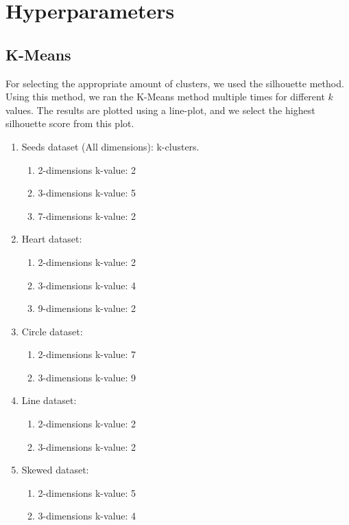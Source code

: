 \chapter{Hyperparameters}
\section{K-Means}
For selecting the appropriate amount of clusters, we used the silhouette method. 
Using this method, we ran the K-Means method multiple times for different $k$ values.
The results are plotted using a line-plot, and we select the highest silhouette score from this plot. 
\begin{enumerate}
  \item Seeds dataset (All dimensions): k-clusters.
  \begin{enumerate}
      \item 2-dimensions k-value: 2
      \item 3-dimensions k-value: 5
      \item 7-dimensions k-value: 2
  \end{enumerate}
      \item Heart dataset:
      \begin{enumerate}
          \item 2-dimensions k-value: 2
          \item 3-dimensions k-value: 4
          \item 9-dimensions k-value: 2
      \end{enumerate}
      \item Circle dataset:
      \begin{enumerate}
          \item 2-dimensions k-value: 7
          \item 3-dimensions k-value: 9
      \end{enumerate}
      \item Line dataset:
      \begin{enumerate}
          \item 2-dimensions k-value: 2
          \item 3-dimensions k-value: 2
      \end{enumerate}
      \item Skewed dataset:
      \begin{enumerate}
          \item 2-dimensions k-value: 5
          \item 3-dimensions k-value: 4
      \end{enumerate}
  \end{enumerate}

